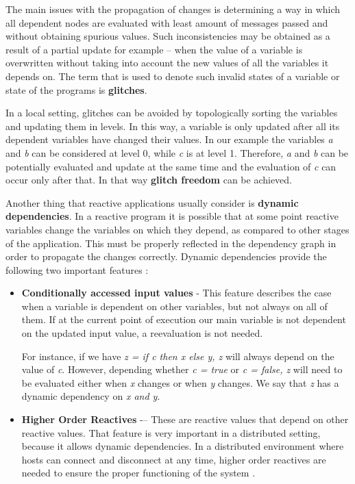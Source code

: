 \documentclass{sigplanconf}
\begin{document}
The main issues with the propagation of changes is determining a way in which all dependent nodes are evaluated with least amount of messages passed and without obtaining spurious values. Such inconsistencies may be obtained as a result of a partial update for example -- when the value of a variable is overwritten without taking into account the new values of all the variables it depends on. The term that is used to denote such invalid states of a variable or state of the programs is \textbf{glitches}.

In a local setting, glitches can be avoided by topologically sorting the variables and updating them in levels. In this way, a variable is only updated after all its dependent variables have changed their values. In our example the variables \textit{a} and \textit{b} can be considered at level 0, while \textit{c} is at level 1. Therefore, \textit{a} and \textit{b} can be potentially evaluated and update at the same time and the evaluation of \textit{c} can occur only after that. In that way \textbf{glitch freedom} can be achieved.

Another thing that reactive applications usually consider is \textbf{dynamic dependencies}. In a reactive program it is possible that at some point reactive variables change the variables on which they depend, as compared to other stages of the application. This must be properly reflected in the dependency graph in order to propagate the changes correctly. Dynamic dependencies provide the following two important features \cite{sidup}:

\begin{itemize} 
\item\textbf{Conditionally accessed input values} - This feature describes the case when a variable is dependent on other variables, but not always on all of them. If at the current point of execution our main variable is not dependent on the updated input value, a reevaluation is not needed.

For instance, if we have \textit{z = if c then x else y, z} will always depend on the value of \textit{c}. However, depending whether \textit{c = true} or \textit{c = false, z} will need to be evaluated either when \textit{x} changes or when \textit{y} changes. We say that \textit{z} has a dynamic dependency on \textit{x and y}.

\item\textbf{Higher Order Reactives} -– These are reactive values that depend on other reactive values. That feature is very important in a distributed setting, because it allows dynamic dependencies. In a distributed environment where hosts can connect and disconnect at any time, higher order reactives are needed to ensure the proper functioning of the system \cite{sidup}.

\end{itemize}
\end{document}

